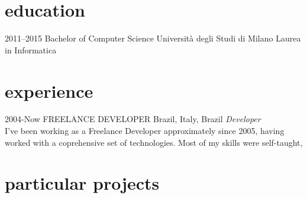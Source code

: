 \documentclass[]{friggeri-cv} %
\begin{document}
\section{education}
\begin{entrylist}
\entry
{2011--2015}
{Bachelor {\normalfont of Computer Science}}
{Università degli Studi di Milano}
{Laurea in Informatica}
\end{entrylist}


\section{experience}
\begin{entrylist}
\entry
{2004-Now}
{FREELANCE DEVELOPER}
{Brazil, Italy, Brazil}
{\emph{Developer} \\ I've been working as a Freelance Developer approximately 
since 2005, having worked with a coprehensive set of technologies. Most of my
skills were self-taught,  
}
\end{entrylist}


\section{particular projects}
\end{document}
